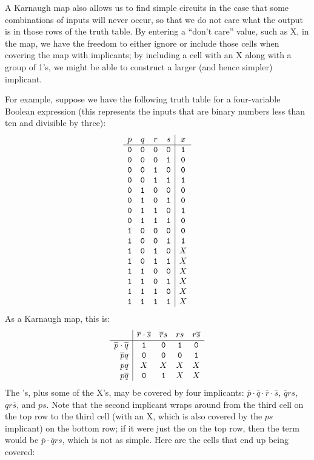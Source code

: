 A Karnaugh map also allows us to find simple circuits in the case that some combinations of inputs will never occur, so that we do not care what the output is in those rows of the truth table. By entering a ``don't care'' value, such as X, in the map, we have the freedom to either ignore or include those cells when covering the map with implicants; by including a cell with an X along with a group of 1's, we might be able to construct a larger (and hence simpler) implicant.

For example, suppose we have the following truth table for a four-variable Boolean expression (this represents the inputs that are binary numbers less than ten and divisible by three):
\[ \begin{array}{cccc|c}
p & q & r & s & x\\ \hline
\mathtt{0} & \mathtt{0} & \mathtt{0} & \mathtt{0} & \mathtt{1}\\
\mathtt{0} & \mathtt{0} & \mathtt{0} & \mathtt{1} & \mathtt{0}\\
\mathtt{0} & \mathtt{0} & \mathtt{1} & \mathtt{0} & \mathtt{0}\\
\mathtt{0} & \mathtt{0} & \mathtt{1} & \mathtt{1} & \mathtt{1}\\
\mathtt{0} & \mathtt{1} & \mathtt{0} & \mathtt{0} & \mathtt{0}\\
\mathtt{0} & \mathtt{1} & \mathtt{0} & \mathtt{1} & \mathtt{0}\\
\mathtt{0} & \mathtt{1} & \mathtt{1} & \mathtt{0} & \mathtt{1}\\
\mathtt{0} & \mathtt{1} & \mathtt{1} & \mathtt{1} & \mathtt{0}\\
\mathtt{1} & \mathtt{0} & \mathtt{0} & \mathtt{0} & \mathtt{0}\\
\mathtt{1} & \mathtt{0} & \mathtt{0} & \mathtt{1} & \mathtt{1}\\
\mathtt{1} & \mathtt{0} & \mathtt{1} & \mathtt{0} & X\\
\mathtt{1} & \mathtt{0} & \mathtt{1} & \mathtt{1} & X\\
\mathtt{1} & \mathtt{1} & \mathtt{0} & \mathtt{0} & X\\
\mathtt{1} & \mathtt{1} & \mathtt{0} & \mathtt{1} & X\\
\mathtt{1} & \mathtt{1} & \mathtt{1} & \mathtt{0} & X\\
\mathtt{1} & \mathtt{1} & \mathtt{1} & \mathtt{1} & X
\end{array} \]
As a Karnaugh map, this is:
\[ \begin{array}{r|cccc}
& \overline{r}\cdot\overline{s} & \overline{r}s & rs & r\overline{s}\\ \hline
\overline{p}\cdot\overline{q} & \mathtt{1} & \mathtt{0} & \mathtt{1} & \mathtt{0}\\
\overline{p}q & \mathtt{0} & \mathtt{0} & \mathtt{0} & \mathtt{1}\\
pq & X & X & X & X\\
p\overline{q} & \mathtt{0} & \mathtt{1} & X & X
\end{array} \]
The \1's, plus some of the X's, may be covered by four implicants: $\overline{p}\cdot\overline{q}\cdot\overline{r}\cdot\overline{s}$, $\overline{q}rs$, $qr\overline{s}$, and $ps$. Note that the second implicant wraps around from the third cell on the top row to the third cell (with an X, which is also covered by the $ps$ implicant) on the bottom row; if it were just the \1 on the top row, then the term would be $\overline{p}\cdot\overline{q}rs$, which is not as simple. Here are the cells that end up being covered:
